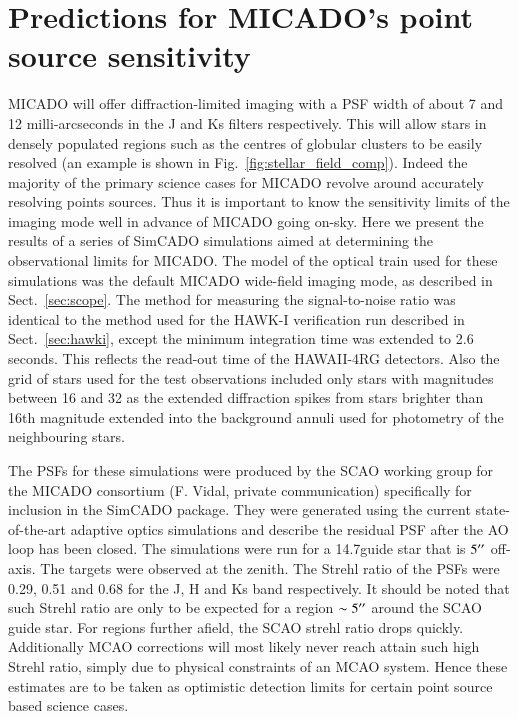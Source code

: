 \section{Predictions for MICADO's point source sensitivity}
\label{sec:predictions}

MICADO will offer diffraction-limited imaging with a PSF width of about 7 and 12 milli-arcseconds in the J and Ks filters respectively. This will allow stars in densely populated regions such as the centres of globular clusters to be easily resolved (an example is shown in Fig.~\ref{fig:stellar_field_comp}). Indeed the majority of the primary science cases for MICADO revolve around accurately resolving points sources. Thus it is important to know the sensitivity limits of the imaging mode well in advance of MICADO going on-sky. Here we present the results of a series of SimCADO simulations aimed at determining the observational limits for MICADO. The model of the optical train used for these simulations was the default MICADO wide-field imaging mode, as described in Sect.~\ref{sec:scope}. The method for measuring the signal-to-noise ratio was identical to the method used for the HAWK-I verification run described in Sect.~\ref{sec:hawki}, except the minimum integration time was extended to 2.6\,seconds. This reflects the read-out time of the HAWAII-4RG detectors. Also the grid of stars used for the test observations included only stars with magnitudes between 16 and 32 as the extended diffraction spikes from stars brighter than 16th magnitude extended into the background annuli used for photometry of the neighbouring stars. 

The PSFs for these simulations were produced by the SCAO working group for the MICADO consortium (F. Vidal, private communication) specifically for inclusion in the SimCADO package. They were generated using the current state-of-the-art adaptive optics simulations and describe the residual PSF after the AO loop has been closed. The simulations were run for a 14.7\m guide star that is $5^{\prime\prime}$ off-axis. The targets were observed at the zenith. The Strehl ratio of the PSFs were 0.29, 0.51 and 0.68 for the J, H and Ks band respectively. It should be noted that such Strehl ratio are only to be expected for a region $\sim5^{\prime\prime}$ around the SCAO guide star. For regions further afield, the SCAO strehl ratio drops quickly. Additionally MCAO corrections will most likely never reach attain such high Strehl ratio, simply due to physical constraints of an MCAO system. Hence these estimates are to be taken as optimistic detection limits for certain point source based science cases.


